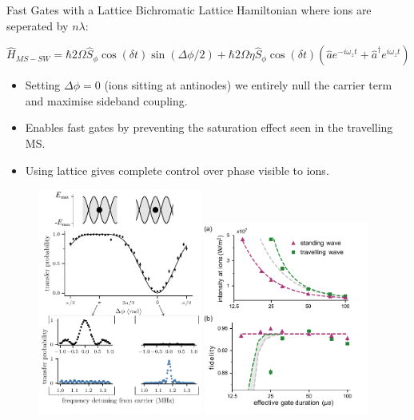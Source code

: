 \documentclass[final]{beamer}
\begin{document}
\begin{frame}{}
\begin{center}
\begin{columns}[t]
\begin{column}{0.49\textwidth}
    \begin{alertblock}{Fast Gates with a Lattice}
      Bichromatic Lattice Hamiltonian where ions are seperated by $n\lambda$:

      \large$$ \hat{H}_{MS-SW} = \hbar 2\Omega \hat{S}_{\phi}\cos{(\delta t)}\sin{(\Delta\phi/2)} + \hbar 2\Omega\eta \hat{S}_\phi\cos{(\delta t)}(\hat{a}e^{-i\omega_zt} + \hat{a}^\dagger e^{i\omega_zt})\cos{(\Delta\phi/2)}$$\normalsize
      \begin{itemize}
      \item Setting $\Delta\phi = 0$ (ions sitting at antinodes) we
        entirely null the carrier term and maximise sideband
        coupling.\\
      \item Enables fast gates by preventing the saturation effect seen in the travelling MS.\\
      \item Using lattice gives complete control over phase visible to ions. \\
      \end{itemize}

      \begin{figure}
        \includegraphics[width=0.48\textwidth]{./figs/Figure_2_v2.pdf}
        \includegraphics[width=0.48\textwidth]{./figs/two_qubit_gate_figure.pdf}
      \end{figure}


\end{alertblock}
\end{column}
\end{columns}
\end{center}
\end{frame}
\end{document}
